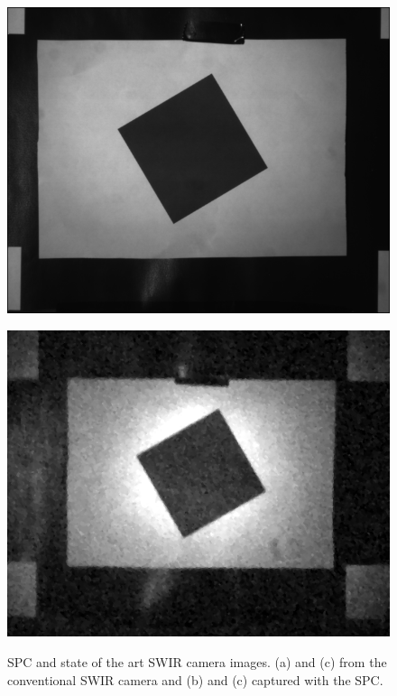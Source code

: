 \begin{figure}[H]
\begin{minipage}[t]{0.40\textwidth}
    \includegraphics[width=1\textwidth]{result/mtf/swir1.png}
    \subcaption{}
    \label{fig:mtf_s1}
\end{minipage}
\begin{minipage}[t]{0.40\textwidth}
    \includegraphics[width=1\textwidth]{result/mtf/spc12.png}
    \subcaption{}
    \label{fig:mtf_spc1}
\end{minipage}
    \caption{SPC and state of the art SWIR camera images. (a) and (c) from the conventional SWIR camera and (b) and (c) captured with the SPC.}
    \label{fig:mtf_target_im}
\end{figure}




